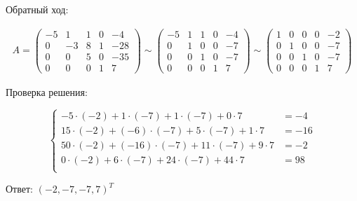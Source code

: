 \documentclass[a4paper,12pt]{report} %
\begin{document}
\noindent Обратный ход:

\begin{gather*}
	A = 
	\begin{pmatrix}
		-5 & 1 & 1 & 0 & -4\\
		0 & -3 & 8 & 1 & -28\\
		0 & 0 & 5 & 0 & -35\\
		0 & 0 & 0 & 1 & 7
	\end{pmatrix} \sim
	\begin{pmatrix}
		-5 & 1 & 1 & 0 & -4\\
		0 & 1 & 0 & 0 & -7\\
		0 & 0 & 1 & 0 & -7\\
		0 & 0 & 0 & 1 & 7
	\end{pmatrix} \sim
	\begin{pmatrix}
		1 & 0 & 0 & 0 & -2\\
		0 & 1 & 0 & 0 & -7\\
		0 & 0 & 1 & 0 & -7\\
		0 & 0 & 0 & 1 & 7
	\end{pmatrix}
\end{gather*}

\noindent Проверка решения:

\[
	\left\{
		\begin{aligned}
			-5 \cdot (-2) + 1 \cdot (-7) + 1 \cdot (-7) + 0 \cdot 7&= -4  \\
			15 \cdot (-2) + (-6) \cdot (-7) + 5 \cdot (-7) + 1 \cdot 7 &= -16\\
			50 \cdot (-2) + (-16) \cdot (-7) + 11 \cdot (-7) + 9 \cdot 7 &= -2\\
			0 \cdot (-2) + 6 \cdot (-7) + 24 \cdot (-7) + 44 \cdot 7 &= 98\\
		\end{aligned}
	\right.
\]

Ответ: $(-2, -7, -7, 7)^T$
\end{document}

